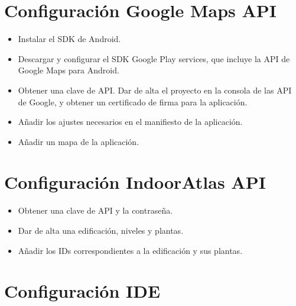 \section{Configuración Google Maps API}

\begin{itemize}
	\item Instalar el SDK de Android. 
	\item Descargar y configurar el SDK Google Play services, que incluye la API de Google Maps para Android. 
	\item Obtener una clave de API. Dar de alta el proyecto en la consola de las API de Google, y obtener un certificado de firma para la aplicación. 
	\item Añadir los ajustes necesarios en el manifiesto de la aplicación. 
	\item Añadir un mapa de la aplicación. 
\end{itemize}

\section{Configuración IndoorAtlas API}

\begin{itemize}
	\item Obtener una clave de API y la contraseña.
	\item Dar de alta una edificación, niveles y plantas.
	\item Añadir los IDs correspondientes a la edificación y  sus plantas.
\end{itemize}

\section{Configuración IDE}

